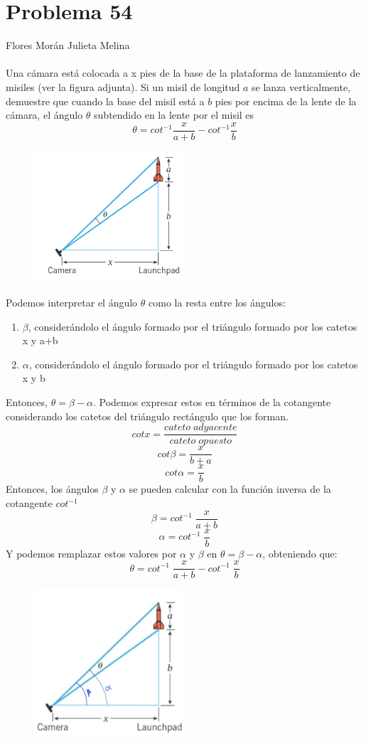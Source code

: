 \documentclass[12pt]{article}
\begin{document}
\section{Problema 54}
Flores Morán Julieta Melina\\
\\
Una cámara está colocada a x pies de la base de la 
plataforma de lanzamiento de misiles (ver la figura adjunta). Si un misil
de longitud $a$ se lanza verticalmente, demuestre que cuando la base del misil está a $b$ pies por encima de la lente de la cámara, el ángulo $\theta $ subtendido en la lente por el misil es
\[
\theta  = cot ^{-1} \frac{x}{a+b} - cot ^{-1} \frac{x}{b}
\]
\begin{figure}[H]
\centering
\includegraphics[width=0.5\textwidth]{img/cam.png}
\end{figure}
Podemos interpretar el ángulo $\theta$ como la resta entre los ángulos:
\begin{enumerate}
\item $\beta$, considerándolo el ángulo formado por el triángulo formado por los catetos  x y a+b
\item $\alpha$, considerándolo el ángulo formado por el triángulo formado por los catetos x y b
\end{enumerate}
Entonces, $ \theta = \beta  - \alpha$.
Podemos expresar estos en términos de la cotangente considerando los catetos del triángulo rectángulo que los forman.
\[
cotx= \frac{cateto \; adyacente}{cateto \; opuesto }
\]
\[
cot\beta = \frac{x}{b+a}
\]
\[
cot\alpha = \frac{x}{b}
\]
Entonces, los ángulos $\beta$ y $\alpha$ se pueden calcular con la función inversa de la cotangente $cot^{-1}$
\[
\beta = cot^{-1}\; \frac{x}{a+b}
\]
\[
\alpha = cot^{-1}\;\frac{x}{b}
\]
Y podemos remplazar estos valores por $\alpha$ y $\beta$ en  $ \theta = \beta  - \alpha$, obteniendo que:
\[
 \theta = cot^{-1}\; \frac{x}{a+b}  - cot^{-1}\;\frac{x}{b}
 \]
\begin{figure}[H]
\centering
\includegraphics[width=0.5\textwidth]{img/ang.jpg}
\end{figure}
\end{document}
